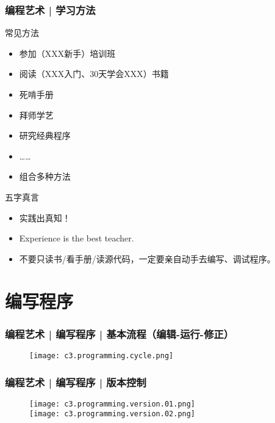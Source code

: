 \begin{frame}
  \frametitle{编程艺术 | 学习方法}
  \begin{block}{常见方法}
    \begin{itemize}
      \item 参加（XXX新手）培训班
      \item 阅读（XXX入门、30天学会XXX）书籍
      \item 死啃手册
      \item 拜师学艺
      \item 研究经典程序
      \item ……
      \item 组合多种方法
    \end{itemize}
  \end{block}
  \pause
  \begin{block}{\alert{五字真言}}
    \begin{itemize}
      \item 实践出真知！
      \item Experience is the best teacher.
      \item 不要只读书/看手册/读源代码，一定要亲自动手去编写、调试程序。
    \end{itemize}
  \end{block}
\end{frame}

\section{编写程序}
\begin{frame}
  \frametitle{编程艺术 | 编写程序 | \alert{基本流程（编辑-运行-修正）}}
  \begin{figure}
    \centering
    \texttt{[image: c3.programming.cycle.png]}
  \end{figure}
\end{frame}

\begin{frame}
  \frametitle{编程艺术 | 编写程序 | 版本控制}
  \begin{figure}
    \centering
    \texttt{[image: c3.programming.version.01.png]}\\
    \texttt{[image: c3.programming.version.02.png]}\\
  \end{figure}
\end{frame}

